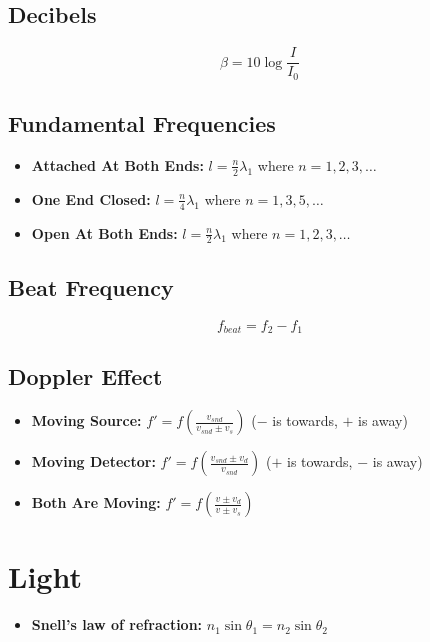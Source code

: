 \documentclass{article}
\begin{document}
\subsection{Decibels}
\begin{equation}
  \beta = 10 \log \frac{I}{I_0}
\end{equation}

\subsection{Fundamental Frequencies} %
\begin{itemize}
  \item \textbf{Attached At Both Ends:} $l = \frac{n}{2} \lambda_1$ where $n = 1, 2, 3,\dots$
  \item \textbf{One End Closed:} $l = \frac{n}{4} \lambda_1$ where $n = 1, 3, 5,\dots$
  \item \textbf{Open At Both Ends:} $l = \frac{n}{2} \lambda_1$ where $n = 1, 2, 3,\dots$
\end{itemize}

\subsection{Beat Frequency}
\begin{equation}
  f_{beat} = f_2 - f_1
\end{equation}

\subsection{Doppler Effect}
\begin{itemize}
  \item \textbf{Moving Source:} $f' = f(\frac{v_{snd}}{v_{snd} \pm v_s})$ ($-$ is towards, $+$ is away)
  \item \textbf{Moving Detector:} $f' = f(\frac{v_{snd} \pm v_d}{v_{snd}})$ ($+$ is towards, $-$ is away)
  \item \textbf{Both Are Moving:} $f' = f(\frac{v \pm v_d}{v \pm v_s})$
\end{itemize}

\section{Light} %
\label{sec:Light}
\begin{itemize}
  \item \textbf{Snell's law of refraction:} $n_1 \sin \theta_1 = n_2 \sin \theta_2$
\end{itemize}
\end{document}
